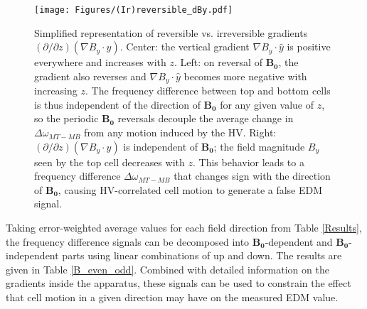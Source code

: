 \documentclass [10pt, twoside] {uwthesis}[2012/04/02]
\begin{document}
\begin{figure}
\begin{center}
\texttt{[image: Figures/(Ir)reversible\_dBy.pdf]}
\end{center}
\caption[Diagram of reversible vs. irreversible vertical field gradients]
{\narrower Simplified representation of reversible vs. irreversible gradients $(\partial/\partial z)(\nabla B_y\cdot\hat{y})$. Center: the vertical gradient $\nabla B_y\cdot\hat{y}$ is positive everywhere and increases with $z$. Left: on reversal of $\mathbf{B_0}$, the gradient also reverses and $\nabla B_y\cdot\hat{y}$ becomes more negative with increasing $z$. The frequency difference between top and bottom cells is thus independent of the direction of $\mathbf{B_0}$ for any given value of $z$, so the periodic $\mathbf{B_0}$ reversals decouple the average change in $\Delta\omega_{MT-MB}$ from any motion induced by the HV. Right: $(\partial/\partial z)(\nabla B_y\cdot\hat{y})$ is independent of $\mathbf{B_0}$; the field magnitude $B_y$ seen by the top cell decreases with $z$. This behavior leads to a frequency difference $\Delta\omega_{MT-MB}$ that changes sign with the direction of $\mathbf{B_0}$, causing HV-correlated cell motion to generate a false EDM signal.}
\label{Reversible_dBy}
\end{figure}

Taking error-weighted average values for each field direction from Table \ref{Results}, the frequency difference signals can be decomposed into $\mathbf{B_0}$-dependent and $\mathbf{B_0}$-independent parts using linear combinations of up and down. The results are given in Table \ref{B_even_odd}. Combined with detailed information on the gradients inside the apparatus, these signals can be used to constrain the effect that cell motion in a given direction may have on the measured EDM value.
\end{document}
